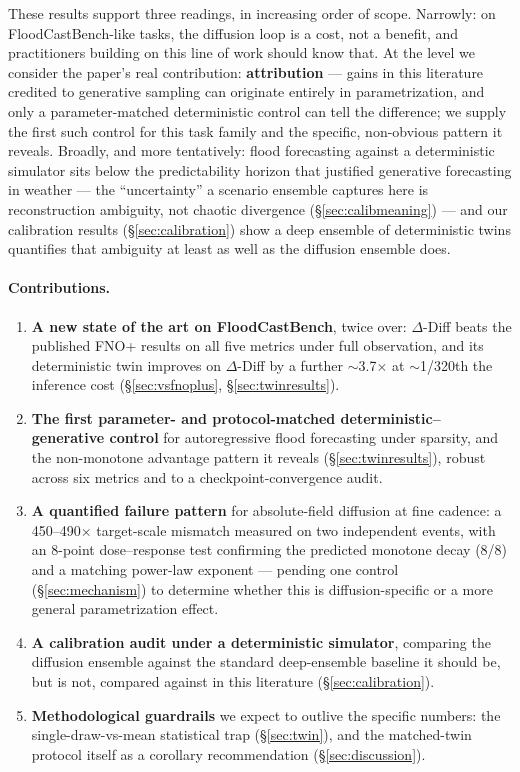 \documentclass[11pt]{article}
\newcommand{\ours}{\mbox{$\Delta$-Diff}}       %
\begin{document}
These results support three readings, in increasing order of scope.
Narrowly: on FloodCastBench-like tasks, the diffusion loop is a cost, not
a benefit, and practitioners building on this line of work should know
that. At the level we consider the paper's real contribution:
\textbf{attribution} --- gains in this literature credited to generative
sampling can originate entirely in parametrization, and only a
parameter-matched deterministic control can tell the difference; we
supply the first such control for this task family and the specific,
non-obvious pattern it reveals. Broadly, and more tentatively: flood
forecasting against a deterministic simulator sits below the
predictability horizon that justified generative forecasting in weather
--- the ``uncertainty'' a scenario ensemble captures here is
reconstruction ambiguity, not chaotic divergence
(\S\ref{sec:calibmeaning}) --- and our calibration results
(\S\ref{sec:calibration}) show a deep ensemble of deterministic twins
quantifies that ambiguity at least as well as the diffusion ensemble
does.

\paragraph{Contributions.}
\begin{enumerate}
  \item \textbf{A new state of the art on FloodCastBench}, twice over:
    \ours{} beats the published FNO+ results on all five metrics under
    full observation, and its deterministic twin improves on \ours{} by a
    further $\sim$3.7$\times$ at $\sim$1/320th the inference cost
    (\S\ref{sec:vsfnoplus}, \S\ref{sec:twinresults}).
  \item \textbf{The first parameter- and protocol-matched
    deterministic--generative control} for autoregressive flood
    forecasting under sparsity, and the non-monotone advantage pattern it
    reveals (\S\ref{sec:twinresults}), robust across six metrics and to a
    checkpoint-convergence audit.
  \item \textbf{A quantified failure pattern} for absolute-field
    diffusion at fine cadence: a 450--490$\times$ target-scale mismatch
    measured on two independent events, with an 8-point dose--response
    test confirming the predicted monotone decay (8/8) and a matching
    power-law exponent --- pending one control (\S\ref{sec:mechanism})
    to determine whether this is diffusion-specific or a more general
    parametrization effect.
  \item \textbf{A calibration audit under a deterministic simulator},
    comparing the diffusion ensemble against the standard deep-ensemble
    baseline it should be, but is not, compared against in this
    literature (\S\ref{sec:calibration}).
  \item \textbf{Methodological guardrails} we expect to outlive the
    specific numbers: the single-draw-vs-mean statistical trap
    (\S\ref{sec:twin}), and the matched-twin protocol itself as a
    corollary recommendation (\S\ref{sec:discussion}).
\end{enumerate}
\end{document}
